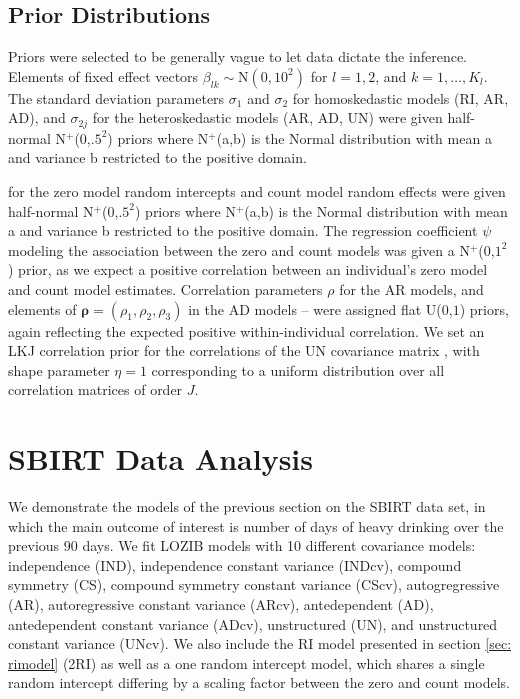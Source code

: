 \documentclass[12pt]{article}
\begin{document}
\subsection{Prior Distributions}

Priors were selected to be generally vague to let data dictate the inference. Elements of fixed effect vectors $\beta_{lk} \sim \text{N}(0, 10^2)$ for $l=1,2$, and $k=1,\dots, K_{l}$. The standard deviation parameters $\sigma_{1}$ and $\sigma_{2}$ for homoskedastic models (RI, AR, AD), and $\sigma_{2j}$ for the heteroskedastic models (AR, AD, UN) were given half-normal N$^+$($0$,$.5^2$) priors where N$^+$(a,b) is the Normal distribution with mean a and variance b restricted to the positive domain.

for the zero model random intercepts and count model random effects were given half-normal N$^+$($0$,$.5^2$) priors where N$^+$(a,b) is the Normal distribution with mean a and variance b restricted to the positive domain. The regression coefficient $\psi$ modeling the association between the zero and count models was given a N$^+$($0$,$1^2$) prior, as we expect a positive correlation between an individual's zero model and count model estimates. Correlation parameters $\rho$ for the AR models, and elements of $\bm{\rho}=(\rho_{1}, \rho_{2}, \rho_{3})$ in the AD models -- were assigned flat U($0$,$1$) priors, again reflecting the expected positive within-individual correlation. We set an LKJ correlation prior \citep{lewandowski2009generating} for the correlations of the UN covariance matrix , with shape parameter $\eta=1$ corresponding to a uniform distribution over all correlation matrices of order $J$.


\section{SBIRT Data Analysis}

We demonstrate the models of the previous section on the SBIRT data set, in which the main outcome of interest is number of days of heavy drinking over the previous $90$ days. We fit LOZIB models with 10 different covariance models: independence (IND), independence constant variance (INDcv), compound symmetry (CS), compound symmetry constant variance (CScv), autogregressive (AR), autoregressive constant variance (ARcv), antedependent (AD), antedependent constant variance (ADcv), unstructured (UN), and unstructured constant variance (UNcv). We also include the RI model presented in section \ref{sec: rimodel} (2RI) as well as a one random intercept model, which shares a single random intercept differing by a scaling factor between the zero and count models.
\end{document}
